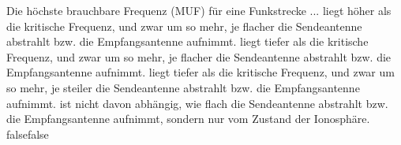     {Die höchste brauchbare Frequenz (MUF) für eine Funkstrecke ...}
    {liegt höher als die kritische Frequenz, und zwar um so mehr, je flacher die Sendeantenne abstrahlt bzw. die Empfangsantenne aufnimmt.}
    {liegt tiefer als die kritische Frequenz, und zwar um so mehr, je flacher die Sendeantenne abstrahlt bzw. die Empfangsantenne aufnimmt.}
    {liegt tiefer als die kritische Frequenz, und zwar um so mehr, je steiler die Sendeantenne abstrahlt bzw. die Empfangsantenne aufnimmt.}
    {ist nicht davon abhängig, wie flach die Sendeantenne abstrahlt bzw. die Empfangsantenne aufnimmt, sondern nur vom Zustand der Ionosphäre.}
    {false}{false}